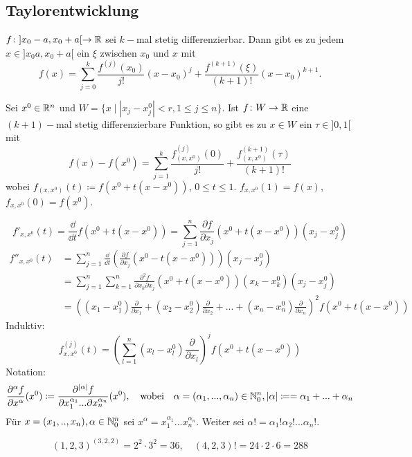 \subsection{Taylorentwicklung}
\begin{satz}[Erinnerung]
	$ f\colon]x_0-a,x_0+a[\rightarrow\mathbb{R} $ sei $ k- $mal stetig differenzierbar. Dann gibt es zu jedem $ x\in]x_0a,x_0+a[ $ ein $ \xi $ zwischen $ x_0 $ und $ x $ mit
	\[ f(x)=\sum_{j=0}^{k}\frac{f^{(j)}(x_0)}{j!}(x-x_0)^j+\frac{f^{(k+1)}(\xi)}{(k+1)!}(x-x_0)^{k+1}. \]
\end{satz}
\newpage
\begin{lemma}
	Sei $ x^0\in\mathbb{R}^n $ und $ W=\lbrace x\mid |x_j-x_j^0|<r,1\leq j\leq n\rbrace $. Ist $ f\colon W\rightarrow\mathbb{R} $ eine $ (k+1)- $mal stetig differenzierbare Funktion, so gibt es zu $ x\in W $ ein $ \tau\in]0,1[ $ mit
	\[ f(x)-f(x^0)=\sum_{j=1}^{k}\frac{f_{(x,x^0)}^{(j)}(0)}{j!}+\frac{f^{(k+1)}_{(x,x^0)}(\tau)}{(k+1)!} \]
	wobei $ f_{(x,x^0)}(t)\coloneqq f(x^0+t(x-x^0)) $, $ 0\leq t\leq 1 $. $ f_{x,x^0}(1)=f(x) $, $ f_{x,x^0}(0)=f(x^0) $.
\end{lemma}
\begin{bemerkung*}[Vorbetrachtung]
	\[ f'_{x,x^0}(t)=\frac{\dd}{\dd t}f(x^0+t(x-x^0))=\sum_{j=1}^{n}\frac{\partial f}{\partial x_j}(x^0+t(x-x^0))(x_j-x_j^0) \]
	\begin{align*} f''_{x,x^0}(t)&=\sum_{j=1}^{n}\frac{\dd}{\dd t}\left(\frac{\partial f}{\partial x_j}(x^0-t(x-x^0))\right)(x_j-x_j^0)\\&=\sum_{j=1}^{n}\sum_{k=1}^{n} \frac{\partial^2 f}{\partial x_k\partial x_j}(x^0+t(x-x^0))(x_k-x_k^0)(x_j-x_j^0)\\&=\left((x_1-x_1^0)\frac{\partial}{\partial x_1}+(x_2-x_2^0)\frac{\partial}{\partial x_2}+...+(x_n-x_n^0)\frac{\partial}{\partial x_n}\right)^2f(x^0+t(x-x^0)) \end{align*}
	Induktiv:
	\[ f^{(j)}_{x,x^0}(t)=\left(\sum_{l=1}^{n}(x_l-x_l^0)\frac{\partial}{\partial x_l}\right)^j f(x^0+t(x-x^0)) \]
	Notation:
	\[ \frac{\partial^\alpha f}{\partial x^\alpha}(x^0)\coloneqq\frac{\partial^{|\alpha|}f}{\partial x_1^{\alpha_1}...\partial x_n^{\alpha_n}}(x^0),\quad\text{wobei}\quad\alpha=(\alpha_1,...,\alpha_n)\in\mathbb{N}_0^n, |\alpha|\coloneqq=\alpha_1+...+\alpha_n \]
	F\"ur $ x=(x_1,..,x_n),\alpha\in\mathbb{N}_0^n $ sei $ x^\alpha=x_1^{\alpha_1}...x_n^{\alpha_n} $. Weiter sei $ \alpha!=\alpha_1!\alpha_2!...\alpha_n! $.
	\begin{beispiel*}
		\[ (1,2,3)^{(3,2,2)}=2^2\cdot 3^2=36,\quad (4,2,3)!=24\cdot 2\cdot 6=288 \]
	\end{beispiel*}
\end{bemerkung*}
